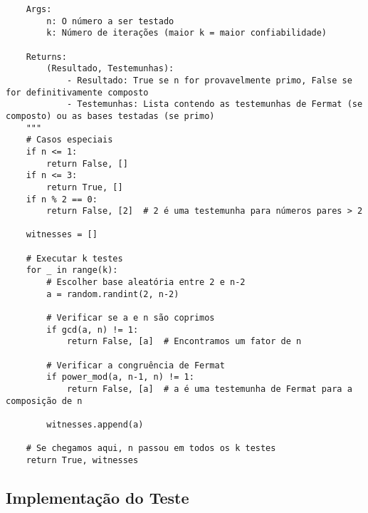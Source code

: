 \begin{verbatim}
    Args:
        n: O número a ser testado
        k: Número de iterações (maior k = maior confiabilidade)
        
    Returns:
        (Resultado, Testemunhas):
            - Resultado: True se n for provavelmente primo, False se for definitivamente composto
            - Testemunhas: Lista contendo as testemunhas de Fermat (se composto) ou as bases testadas (se primo)
    """
    # Casos especiais
    if n <= 1:
        return False, []
    if n <= 3:
        return True, []
    if n % 2 == 0:
        return False, [2]  # 2 é uma testemunha para números pares > 2
    
    witnesses = []
    
    # Executar k testes
    for _ in range(k):
        # Escolher base aleatória entre 2 e n-2
        a = random.randint(2, n-2)
        
        # Verificar se a e n são coprimos
        if gcd(a, n) != 1:
            return False, [a]  # Encontramos um fator de n
        
        # Verificar a congruência de Fermat
        if power_mod(a, n-1, n) != 1:
            return False, [a]  # a é uma testemunha de Fermat para a composição de n
        
        witnesses.append(a)
    
    # Se chegamos aqui, n passou em todos os k testes
    return True, witnesses
\end{verbatim}

\subsection{Implementação do Teste}

